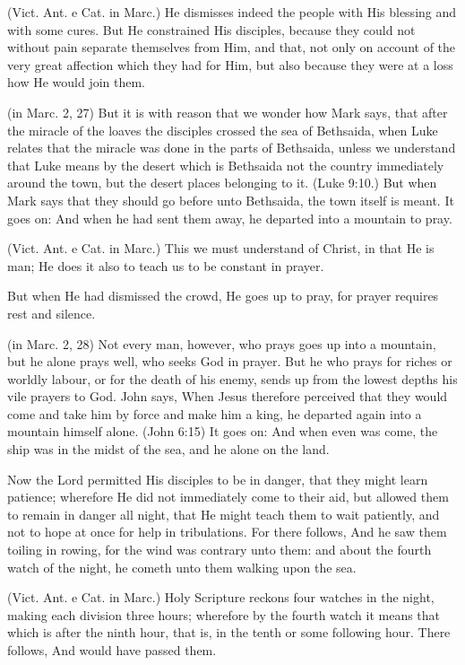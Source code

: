  (Vict. Ant. e Cat. in Marc.) He dismisses indeed the people with His blessing and with some cures. But He constrained His disciples, because they could not without pain separate themselves from Him, and that, not only on account of the very great affection which they had for Him, but also because they were at a loss how He would join them.

 (in Marc. 2, 27) But it is with reason that we wonder how Mark says, that after the miracle of the loaves the disciples crossed the sea of Bethsaida, when Luke relates that the miracle was done in the parts of Bethsaida, unless we understand that Luke means by the desert which is Bethsaida not the country immediately around the town, but the desert places belonging to it. (Luke 9:10.) But when Mark says that they should go before unto Bethsaida, the town itself is meant. It goes on: And when he had sent them away, he departed into a mountain to pray.

 (Vict. Ant. e Cat. in Marc.) This we must understand of Christ, in that He is man; He does it also to teach us to be constant in prayer.

 But when He had dismissed the crowd, He goes up to pray, for prayer requires rest and silence.

 (in Marc. 2, 28) Not every man, however, who prays goes up into a mountain, but he alone prays well, who seeks God in prayer. But he who prays for riches or worldly labour, or for the death of his enemy, sends up from the lowest depths his vile prayers to God. John says, When Jesus therefore perceived that they would come and take him by force and make him a king, he departed again into a mountain himself alone. (John 6:15) It goes on: And when even was come, the ship was in the midst of the sea, and he alone on the land.

 Now the Lord permitted His disciples to be in danger, that they might learn patience; wherefore He did not immediately come to their aid, but allowed them to remain in danger all night, that He might teach them to wait patiently, and not to hope at once for help in tribulations. For there follows, And he saw them toiling in rowing, for the wind was contrary unto them: and about the fourth watch of the night, he cometh unto them walking upon the sea.

 (Vict. Ant. e Cat. in Marc.) Holy Scripture reckons four watches in the night, making each division three hours; wherefore by the fourth watch it means that which is after the ninth hour, that is, in the tenth or some following hour. There follows, And would have passed them.

